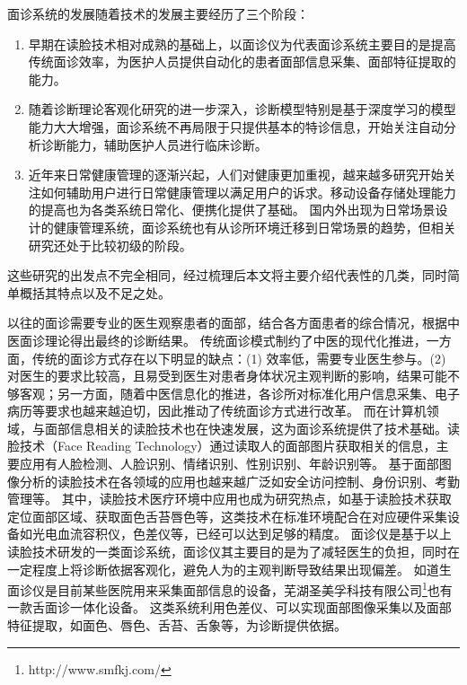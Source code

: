面诊系统的发展随着技术的发展主要经历了三个阶段：
\begin{enumerate}
    \item 早期在读脸技术相对成熟的基础上，以面诊仪为代表面诊系统主要目的是提高传统面诊效率，为医护人员提供自动化的患者面部信息采集、面部特征提取的能力。
    \item 随着诊断理论客观化研究的进一步深入，诊断模型特别是基于深度学习的模型能力大大增强，面诊系统不再局限于只提供基本的特诊信息，开始关注自动分析诊断能力，辅助医护人员进行临床诊断。
    \item 近年来日常健康管理的逐渐兴起，人们对健康更加重视，越来越多研究开始关注如何辅助用户进行日常健康管理以满足用户的诉求。移动设备存储处理能力的提高也为各类系统日常化、便携化提供了基础。
    国内外出现为日常场景设计的健康管理系统，面诊系统也有从诊所环境迁移到日常场景的趋势，但相关研究还处于比较初级的阶段。
\end{enumerate}

这些研究的出发点不完全相同，经过梳理后本文将主要介绍代表性的几类，同时简单概括其特点以及不足之处。

以往的面诊需要专业的医生观察患者的面部，结合各方面患者的综合情况，根据中医面诊理论得出最终的诊断结果。
传统面诊模式制约了中医的现代化推进，一方面，传统的面诊方式存在以下明显的缺点：(1) 效率低，需要专业医生参与。(2) 对医生的要求比较高，且易受到医生对患者身体状况主观判断的影响，结果可能不够客观；另一方面，随着中医信息化的推进，各诊所对标准化用户信息采集、电子病历等要求也越来越迫切，因此推动了传统面诊方式进行改革。
而在计算机领域，与面部信息相关的读脸技术也在快速发展，这为面诊系统提供了技术基础。读脸技术（Face Reading Technology）通过读取人的面部图片获取相关的信息，主要应用有人脸检测、人脸识别、情绪识别、性别识别、年龄识别等\cite{Schroff2015FaceNet, Zhang2016Joint, corneanu2016survey}。
基于面部图像分析的读脸技术在各领域的应用也越来越广泛如安全访问控制\cite{liu2005ibotguard}、身份识别\cite{he2015delving}、考勤管理\cite{surekha2017attendance}等。
其中，读脸技术医疗环境中应用也成为研究热点，如基于读脸技术获取定位面部区域、获取面色舌苔唇色等，这类技术在标准环境配合在对应硬件采集设备如光电血流容积仪，色差仪等，已经可以达到足够的精度。
面诊仪是基于以上读脸技术研发的一类面诊系统，面诊仪其主要目的是为了减轻医生的负担，同时在一定程度上将诊断依据客观化，避免人为的主观判断导致结果出现偏差\cite{李丹溪2017舌诊仪的发展及其在舌诊客观化研究中的应用现状}。
如道生面诊仪\cite{邸丹2016手持式舌象仪的研制}是目前某些医院用来采集面部信息的设备，芜湖圣美孚科技有限公司\footnote{http://www.smfkj.com/}也有一款舌面诊一体化设备。
这类系统利用色差仪、可以实现面部图像采集以及面部特征提取，如面色、唇色、舌苔、舌象等，为诊断提供依据。


